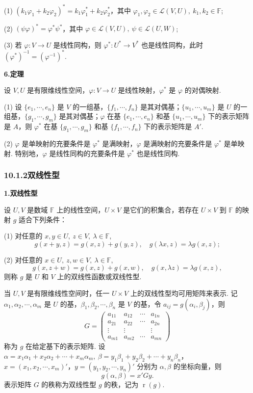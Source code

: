 \documentclass[UTF8, 12pt, fontset=fandol, oneside]{ctexart}
\begin{document}
(1) $(k_1\varphi_1+k_2\varphi_2)^*=k_1\varphi_1^*+k_2\varphi_2^*$，其中 $\varphi_1,\varphi_2\in\mathcal{L}(V,U),\ k_1,k_2\in\mathbb{F}$;

(2) $(\psi\varphi)^*=\varphi^*\psi^*$，其中 $\varphi\in\mathcal{L}(V,U),\ \psi\in\mathcal{L}(U,W)$;

(3) 若 $\varphi:V\to U$ 是线性同构，则 $\varphi^*:U^*\to V^*$ 也是线性同构，此时 $(\varphi^*)^{-1}=(\varphi^{-1})^*$.

\noindent\textbf{6.\quad 定理}

设 $V,U$ 是有限维线性空间，$\varphi:V\to U$ 是线性映射，$\varphi^*$ 是 $\varphi$ 的对偶映射.

(1) 设 $\{e_1,\cdots,e_n\}$ 是 $V$ 的一组基，$\{f_1,\cdots,f_n\}$ 是其对偶基；$\{u_1,\cdots,u_m\}$ 是 $U$ 的一组基，$\{g_1,\cdots,g_m\}$ 是其对偶基；$\varphi$ 在基 $\{e_1,\cdots,e_n\}$ 和基 $\{u_1,\cdots,u_m\}$ 下的表示矩阵是 $A$，则 $\varphi^*$ 在基 $\{g_1,\cdots,g_m\}$ 和基 $\{f_1,\cdots,f_n\}$ 下的表示矩阵是 $A'$.

(2) $\varphi$ 是单映射的充要条件是 $\varphi^*$ 是满映射，$\varphi$ 是满映射的充要条件是 $\varphi^*$ 是单映射. 特别地，$\varphi$ 是线性同构的充要条件是 $\varphi^*$ 也是线性同构.

\subsubsection*{10.1.2\quad 双线性型}

\noindent\textbf{1.\quad 双线性型}

设 $U,V$ 是数域 $\mathbb{F}$ 上的线性空间，$U\times V$ 是它们的积集合，若存在 $U\times V$ 到 $\mathbb{F}$ 的映射 $g$ 适合下列条件：

(1) 对任意的 $x,y\in U,\ z\in V,\ \lambda\in\mathbb{F}$,
\[
g(x+y,z)=g(x,z)+g(y,z),\quad g(\lambda x,z)=\lambda g(x,z);
\]

(2) 对任意的 $x\in U,\ z,w\in V,\ \lambda\in\mathbb{F}$,
\[
g(x,z+w)=g(x,z)+g(x,w),\quad g(x,\lambda z)=\lambda g(x,z),
\]
则称 $g$ 是 $U$ 和 $V$ 上的双线性函数或双线性型.

当 $U,V$ 是有限维线性空间时，任一 $U\times V$ 上的双线性型均可用矩阵来表示. 记 $\alpha_1,\alpha_2,\cdots,\alpha_m$ 是 $U$ 的基，$\beta_1,\beta_2,\cdots,\beta_n$ 是 $V$ 的基，令 $a_{ij}=g(\alpha_i,\beta_j)$，则
\[
G=\left(\begin{array}{cccc}
a_{11} & a_{12} & \cdots & a_{1n}\\
a_{21} & a_{22} & \cdots & a_{2n}\\
\vdots & \vdots &        & \vdots\\
a_{m1} & a_{m2} & \cdots & a_{mn}
\end{array}\right)
\]
称为 $g$ 在给定基下的表示矩阵. 设 $\alpha=x_1\alpha_1+x_2\alpha_2+\cdots+x_m\alpha_m,\ \beta=y_1\beta_1+y_2\beta_2+\cdots+y_n\beta_n$，$x=(x_1,x_2,\cdots,x_m)'$，$y=(y_1,y_2,\cdots,y_n)'$ 分别为 $\alpha,\beta$ 的坐标向量，则
\[
g(\alpha,\beta)=x'Gy.
\]
表示矩阵 $G$ 的秩称为双线性型 $g$ 的秩，记为 $\operatorname{r}(g)$.
\end{document}
